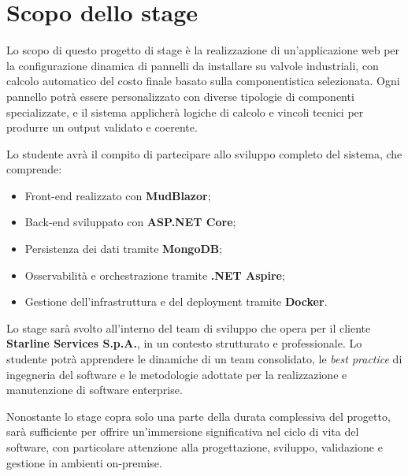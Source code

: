 \section*{Scopo dello stage}

Lo scopo di questo progetto di stage è la realizzazione di un'applicazione web per la configurazione dinamica di pannelli da installare su valvole industriali, con calcolo automatico del costo finale basato sulla componentistica selezionata. Ogni pannello potrà essere personalizzato con diverse tipologie di componenti specializzate, e il sistema applicherà logiche di calcolo e vincoli tecnici per produrre un output validato e coerente.

Lo studente avrà il compito di partecipare allo sviluppo completo del sistema, che comprende:

\begin{itemize}
    \item Front-end realizzato con \textbf{MudBlazor};
    \item Back-end sviluppato con \textbf{ASP.NET Core};
    \item Persistenza dei dati tramite \textbf{MongoDB};
    \item Osservabilità e orchestrazione tramite \textbf{.NET Aspire};
    \item Gestione dell’infrastruttura e del deployment tramite \textbf{Docker}.
\end{itemize}

Lo stage sarà svolto all’interno del team di sviluppo che opera per il cliente \textbf{Starline Services S.p.A.}, in un contesto strutturato e professionale. Lo studente potrà apprendere le dinamiche di un team consolidato, le \textit{best practice} di ingegneria del software e le metodologie adottate per la realizzazione e manutenzione di software enterprise.

Nonostante lo stage copra solo una parte della durata complessiva del progetto, sarà sufficiente per offrire un’immersione significativa nel ciclo di vita del software, con particolare attenzione alla progettazione, sviluppo, validazione e gestione in ambienti on-premise.

